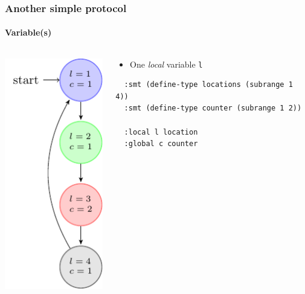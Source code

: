 \begin{frame}[fragile]
  \frametitle{Another simple protocol}
  \framesubtitle{Variable(s)}

\begin{columns}
\begin{column}{0.3\textwidth}
\centering
\includegraphics{pictures/demo-prot2-fig}
\end{column}


\begin{column}{0.7\textwidth}
  \begin{itemize}
    \item One {\it local} variable {\tt l}
  \end{itemize}
{\small  
  \begin{verbatim}
  :smt (define-type locations (subrange 1 4))
  :smt (define-type counter (subrange 1 2))

  :local l location
  :global c counter
  \end{verbatim}
}
\end{column}

\end{columns}  

\end{frame}




